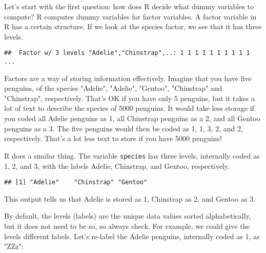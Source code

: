 Let's start with the first question: how does R decide what dummy variables to compute? R computes dummy variables for factor variables. A factor variable in R has a certain structure. If we look at the species factor, we see that it has three levels. 

\begin{knitrout}
\color{fgcolor}\begin{kframe}
\begin{alltt}
\hlopt{$}
\end{alltt}
\begin{verbatim}
##  Factor w/ 3 levels "Adelie","Chinstrap",..: 1 1 1 1 1 1 1 1 1 1 ...
\end{verbatim}
\end{kframe}
\end{knitrout}

Factors are a way of storing information effectively. Imagine that you have five penguins, of the species "Adelie", "Adelie", "Gentoo", "Chinstrap" and "Chinstrap", respectively. That's OK if you have only 5 penguins, but it takes a lot of text to describe the species of 5000 penguins. It would take less storage if you coded all Adelie penguins as 1, all Chinstrap penguins as a 2, and all Gentoo penguins as a 3. The five penguins would then be coded as 1, 1, 3, 2, and 2, respectively. That's a lot less text to store if you have 5000 penguins!

R does a similar thing. The variable \texttt{species} has three levels, internally coded as 1, 2, and 3, with the labels Adelie, Chinstrap, and Gentoo, respectively. 

\begin{knitrout}
\color{fgcolor}\begin{kframe}
\begin{alltt}
\hlopt{$}
\end{alltt}
\begin{verbatim}
## [1] "Adelie"    "Chinstrap" "Gentoo"
\end{verbatim}
\end{kframe}
\end{knitrout}

This output tells us that Adelie is stored as 1, Chinstrap as 2, and Gentoo as 3. 

By default, the levels (labels) are the unique data values sorted alphabetically, but it does not need to be so, so always check. For example, we could give the levels different labels. Let's re-label the Adelie penguins, internally coded as 1, as "ZZz": 

